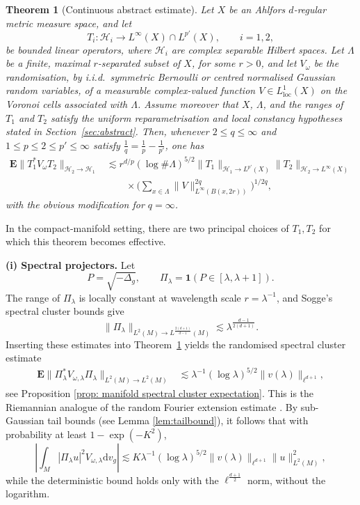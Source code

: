 \documentclass[12pt,reqno]{amsart}
\newtheorem{theorem}{Theorem}[section]
\theoremstyle{definition}
\theoremstyle{remark}
\numberwithin{equation}{section}
\newcommand{\1}{\mathbbm{1}}
\def\rd{\mathrm{d}}
\begin{document}
\begin{theorem}[Continuous abstract estimate]\label{thm:abstract2_intro}
Let $X$ be an Ahlfors $d$-regular metric measure space, and let
\[
T_i:\mathcal{H}_i\to L^\infty(X)\cap L^{p'}(X), \qquad i=1,2,
\]
be bounded linear operators, where $\mathcal{H}_i$ are complex separable Hilbert spaces. Let $\Lambda$ be a finite, maximal $r$-separated subset of $X$, for some $r>0$, and let $V_\omega$ be the randomisation, by i.i.d.~symmetric  Bernoulli or centred normalised Gaussian random variables, of a measurable complex-valued function $V\in L^1_{\mathrm{loc}}(X)$ on the Voronoi cells associated with $\Lambda$. Assume moreover that $X$, $\Lambda$, and the ranges of $T_1$ and $T_2$ satisfy the uniform reparametrisation and local constancy hypotheses stated in Section~\ref{sec:abstract}. Then, whenever $2\leq q\leq\infty$ and $1\leq p\leq 2\leq p'\leq \infty$ satisfy $\frac{1}{q}=\frac{1}{p}-\frac{1}{p'}$, one has
\begin{align*}
\mathbf{E}\|T_1^*V_{\omega}T_2\|_{\mathcal{H}_2\to \mathcal{H}_1}
&\lesssim
r^{d/p}
(\log \#\Lambda)^{5/2}
\|T_1\|_{\mathcal{H}_1\to L^{p'}(X)}
\|T_2\|_{\mathcal{H}_2\to L^\infty(X)}
\\
&\qquad \times
\Big(\sum_{x\in \Lambda}\|V\|_{L^\infty(B(x,2r))}^{2q}\Big)^{1/2q},
\end{align*}
with the obvious modification for $q=\infty$.
\end{theorem}
In the compact-manifold setting, there are two principal choices of \(T_1,T_2\) for which this theorem becomes effective.

\medskip

\noindent
\textbf{(i) Spectral projectors.}
Let
\[
P=\sqrt{-\Delta_g},
\qquad
\Pi_\lambda=\mathbf 1(P\in[\lambda,\lambda+1]).
\]
The range of \(\Pi_\lambda\) is locally constant at wavelength scale \(r=\lambda^{-1}\), and Sogge's spectral cluster bounds give
\[
\|\Pi_\lambda\|_{L^2(M)\to L^{\frac{2(d+1)}{d-1}}(M)}
\lesssim
\lambda^{\frac{d-1}{2(d+1)}}.
\]
Inserting these estimates into Theorem~\ref{thm:abstract2_intro} yields the  randomised spectral cluster estimate
    \begin{align*}
    \mathbf{E}\|\Pi_{\lambda} ^*V_{\omega,\lambda}\Pi_{\lambda} \|_{L^2(M)\to L^2(M)}
    & \lesssim \lambda^{-1}(\log \lambda )^{5/2}\|v(\lambda)\|_{\ell^{d+1}},
  \end{align*}  
see Proposition \ref{prop: manifold spectral cluster expectation}. 
This is the Riemannian analogue of the random Fourier extension estimate \cite[Section 6]{CueninMerz2025}. By sub-Gaussian tail bounds (see Lemma \ref{lem:tailbound}), it follows that with probability at least $1-\exp(-K^2)$, 
\[
\left|\int_M |\Pi_{\lambda}u|^2V_{\omega,\lambda}\rd v_g\right|\lesssim K \lambda^{-1}(\log \lambda )^{5/2}\|v(\lambda)\|_{\ell^{d+1}}\|u\|_{L^2(M)}^2,
\]
while the deterministic bound holds only with the ${\ell^{\frac{d+1}{2}}}$ norm, without the logarithm. 
\end{document}
